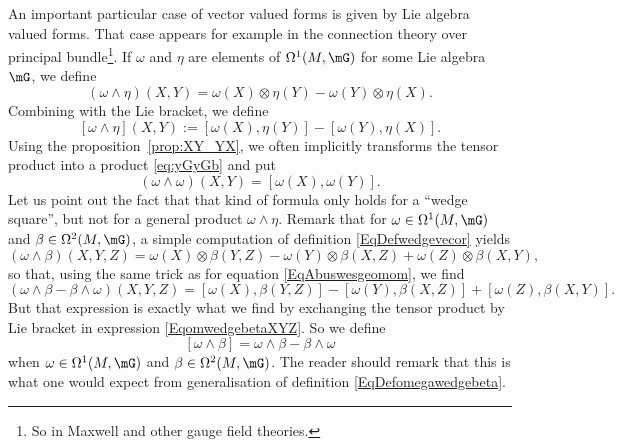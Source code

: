 																								An important particular case of vector valued forms is given by Lie algebra valued forms. That case appears for example in the connection theory over principal bundle\footnote{So in Maxwell and other gauge field theories.}. If $\omega$ and $\eta$ are elements of $\Omega^1(M,\mG)$ for some Lie algebra $\mG$, we define
																								\[
																									(\omega\wedge\eta)(X,Y)=\omega(X)\otimes\eta(Y)-\omega(Y)\otimes\eta(X).
																									\]
																									Combining with the Lie bracket, we define
																									\begin{equation}	\label{EqDefomegawedgebeta}
																									[\omega\wedge\eta](X,Y):=[\omega(X),\eta(Y)]-[\omega(Y),\eta(X)].
																																						 \end{equation}
																																						 Using the proposition~\ref{prop:XY_YX}, we often implicitly transforms the tensor product into a product \eqref{eq:yGyGb} and put
																																						 \begin{equation}	\label{EqAbuswesgeomom}
																																						 (\omega\wedge\omega)(X,Y)=[\omega(X),\omega(Y)].
																																						 \end{equation}
																																						 Let us point out the fact that that kind of formula only holds for a ``wedge square'', but not for a general product $\omega\wedge\eta$. Remark that for $\omega\in\Omega^1(M,\mG)$ and $\beta\in\Omega^2(M,\mG)$, a simple computation of definition \eqref{EqDefwedgevecor} yields
																																						 \begin{equation}	\label{EqomwedgebetaXYZ}
																																						 (\omega\wedge\beta)(X,Y,Z)=\omega(X)\otimes\beta(Y,Z)-\omega(Y)\otimes\beta(X,Z)+\omega(Z)\otimes\beta(X,Y),
																																						 \end{equation}
																																						 so that, using the same trick as for equation \eqref{EqAbuswesgeomom}, we find
																																						 \[
																																							 (\omega\wedge\beta-\beta\wedge\omega)(X,Y,Z)=[\omega(X),\beta(Y,Z)]-[\omega(Y),\beta(X,Z)]+[\omega(Z),\beta(X,Y)].
																																							 \]
																																							 But that expression is exactly what we find by exchanging the tensor product by Lie bracket in expression \eqref{EqomwedgebetaXYZ}. So we define
																																							 \begin{equation}	\label{EqDefCrochwedgedeux}
																																							 [\omega\wedge\beta]=\omega\wedge\beta-\beta\wedge\omega
																																							 \end{equation}
																																							 when $\omega\in\Omega^1(M,\mG)$ and $\beta\in\Omega^2(M,\mG)$. The reader should remark that this is what one would expect from generalisation of definition \eqref{EqDefomegawedgebeta}.
